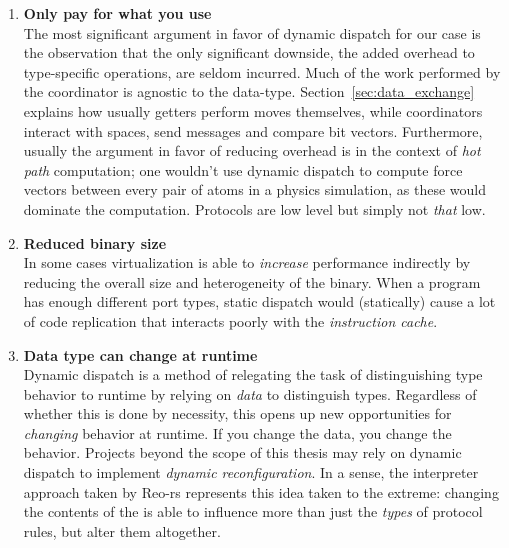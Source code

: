 \begin{enumerate}
	\item \textbf{Only pay for what you use}\\
	The most significant argument in favor of dynamic dispatch for our case is the observation that the only significant downside, the added overhead to type-specific operations, are seldom incurred. Much of the work performed by the coordinator is agnostic to the data-type. Section~\ref{sec:data_exchange} explains how usually getters perform moves themselves, while coordinators interact with spaces, send messages and compare bit vectors. Furthermore, usually the argument in favor of reducing overhead is in the context of \textit{hot path} computation; one wouldn't use dynamic dispatch to compute force vectors between every pair of atoms in a physics simulation, as these would dominate the computation. Protocols are low level but simply not \textit{that} low.
	
	\item \textbf{Reduced binary size}\\
	In some cases virtualization is able to \textit{increase} performance indirectly by reducing the overall size and heterogeneity of the binary. When a program has enough different port types, static dispatch would (statically) cause a lot of code replication that interacts poorly with the \textit{instruction cache}.
	
	\item \textbf{Data type can change at runtime}\\
	Dynamic dispatch is a method of relegating the task of distinguishing type behavior to runtime by relying on \textit{data} to distinguish types. Regardless of whether this is done by necessity, this opens up new opportunities for \textit{changing} behavior at runtime. If you change the data, you change the behavior. Projects beyond the scope of this thesis may rely on dynamic dispatch to implement \textit{dynamic reconfiguration}. In a sense, the interpreter approach taken by Reo-rs represents this idea taken to the extreme: changing the contents of the  is able to influence more than just the \textit{types} of protocol rules, but alter them altogether.
\end{enumerate}

